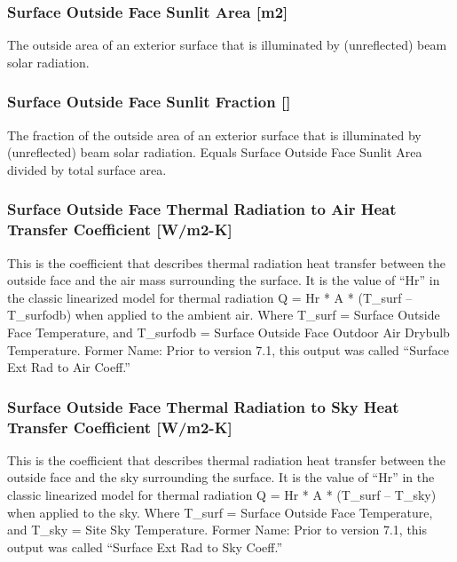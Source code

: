 \subsubsection{Surface Outside Face Sunlit Area {[}m2{]}}\label{surface-outside-face-sunlit-area-m2}

The outside area of an exterior surface that is illuminated by (unreflected) beam solar radiation.

\subsubsection{Surface Outside Face Sunlit Fraction {[]}}\label{surface-outside-face-sunlit-fraction}

The fraction of the outside area of an exterior surface that is illuminated by (unreflected) beam solar radiation. Equals Surface Outside Face Sunlit Area divided by total surface area.

\subsubsection{Surface Outside Face Thermal Radiation to Air Heat Transfer Coefficient {[}W/m2-K{]}}\label{surface-outside-face-thermal-radiation-to-air-heat-transfer-coefficient-wm2-k}

This is the coefficient that describes thermal radiation heat transfer between the outside face and the air mass surrounding the surface. It is the value of ``Hr'' in the classic linearized model for thermal radiation Q = Hr * A * (T\_surf -- T\_surfodb) when applied to the ambient air. Where T\_surf = Surface Outside Face Temperature, and T\_surfodb = Surface Outside Face Outdoor Air Drybulb Temperature. Former Name: Prior to version 7.1, this output was called ``Surface Ext Rad to Air Coeff.''

\subsubsection{Surface Outside Face Thermal Radiation to Sky Heat Transfer Coefficient {[}W/m2-K{]}}\label{surface-outside-face-thermal-radiation-to-sky-heat-transfer-coefficient-wm2-k}

This is the coefficient that describes thermal radiation heat transfer between the outside face and the sky surrounding the surface. It is the value of ``Hr'' in the classic linearized model for thermal radiation Q = Hr * A * (T\_surf -- T\_sky) when applied to the sky. Where T\_surf = Surface Outside Face Temperature, and T\_sky = Site Sky Temperature. Former Name: Prior to version 7.1, this output was called ``Surface Ext Rad to Sky Coeff.''

